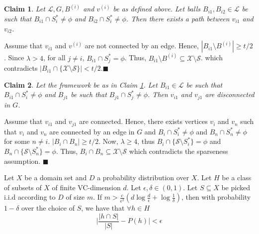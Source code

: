 \documentclass[orivec]{llncs}
\newtheorem{smallLemma}{Claim}
\newcommand{\mc}{\mathcal}
\renewcommand{\qed}{\hfill\ensuremath{\blacksquare}}
\begin{document}
\vspace{-0.1in}\begin{smallLemma}
\label{claim:lambda1}
Let $\mc L, G, B^{(i)}$ and $v^{(i)}$ be as defined above. Let balls $B_{i1}, B_{i2} \in \mc L$ be such that $B_{i1} \cap S_i^* \neq \phi$ and $B_{i2} \cap S_i^* \neq \phi$. Then there exists a path between $v_{i1}$ and $v_{i2}$.
\end{smallLemma}
\vspace{-0.1in} Assume that $v_{i1}$ and $v^{(i)}$ are not connected by an edge. Hence, $|B_{i1} \setminus B^{(i)}| \ge t/2$. Since $\lambda > 4$, for all $j \neq i$, $B_{i1} \cap S_j^* = \phi$. Thus, $B_{i1} \setminus B^{(i)} \subseteq \mc X \setminus \mc S$. which contradicts $|B_{i1} \cap \{\mc X \setminus \mc S\}| < t/2$.\qed

\vspace{-0.1in}\begin{smallLemma}
Let the framework be as in Claim \ref{claim:lambda1}. Let $B_{i1} \in \mc L$ be such that $B_{i1} \cap S_i^* \neq \phi$ and $B_{j1}$ be such that $B_{j1} \cap S_j^* \neq \phi$. Then $v_{i1}$ and $v_{j1}$ are disconnected in $G$.
\end{smallLemma}
\vspace{-0.1in} Assume that $v_{i1}$ and $v_{j1}$ are connected. Hence, there exists vertices $v_{i}$ and $v_{n}$ such that $v_i$ and $v_n$ are connected by an edge in $G$ and $B_i \cap S_i^* \neq \phi$ and $B_n \cap S_n^* \neq \phi$ for some $n \neq i$. $|B_i \cap B_n| \ge t/2$. Now, $\lambda \ge 4$, thus $B_i \cap \{\mc S \setminus S_i^*\} = \phi$ and $B_n \cap \{\mc S\setminus S_n^*\} = \phi$. Thus, $B_i \cap B_n \subseteq \mc X \setminus \mc S$ which contradicts the sparseness assumption.
\qed

\label{appendix:sectiontr}
\begin{theorem}\label{theorem:vceapprox}
Let $X$ be a domain set and $D$ a probability distribution over $X$. Let $H$ be a class of subsets of $X$ of finite VC-dimension $d$. Let $\epsilon, \delta \in (0,1)$. Let $S \subseteq X$ be picked i.i.d according to $D$ of size $m$. If $m > \frac{c}{\epsilon^2}(d\log \frac{d}{\epsilon}+\log\frac{1}{\delta})$, then  with probability $1-\delta$ over the choice of $S$, we have that $\forall h \in H$
$$\bigg|\frac{|h\cap S|}{|S|} - P(h)\bigg| < \epsilon$$
\end{theorem}
\end{document}
